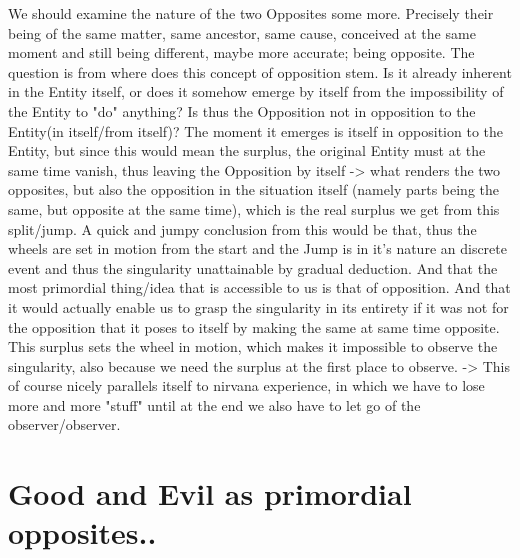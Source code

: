 \documentclass[10pt]{book}
\begin{document}
We should examine the nature of the two Opposites some more. Precisely their being of the same matter, same ancestor, same cause, conceived at the same moment and still being different, maybe more accurate; being opposite. The question is from where does this concept of opposition stem. Is it already inherent in the Entity itself, or does it somehow emerge by itself from the impossibility of the Entity to "do" anything? Is thus the Opposition not in opposition to the Entity(in itself/from itself)? The moment it emerges is itself in opposition to the Entity, but since this would mean the surplus, the original Entity must at the same time vanish, thus leaving the Opposition by itself -> what renders the two opposites, but also the opposition in the situation itself (namely parts being the same, but opposite at the same time), which is the real surplus we get from this split/jump. 
A quick and jumpy conclusion from this would be that, thus the wheels are set in motion from the start and the Jump is in it's nature an discrete event and thus the singularity unattainable by gradual deduction. And that the most primordial thing/idea that is accessible to us is that of opposition. And that it would actually enable us to grasp the singularity in its entirety if it was not for the opposition that it poses to itself by making the same at same time opposite. This surplus sets the wheel in motion, which makes it impossible to observe the singularity, also because we need the surplus at the first place to observe. -> This of course nicely parallels itself to nirvana experience, in which we have to lose more and more "stuff" until at the end we also have to let go of the observer/observer.


\section{Good and Evil as primordial opposites..}
\end{document}

